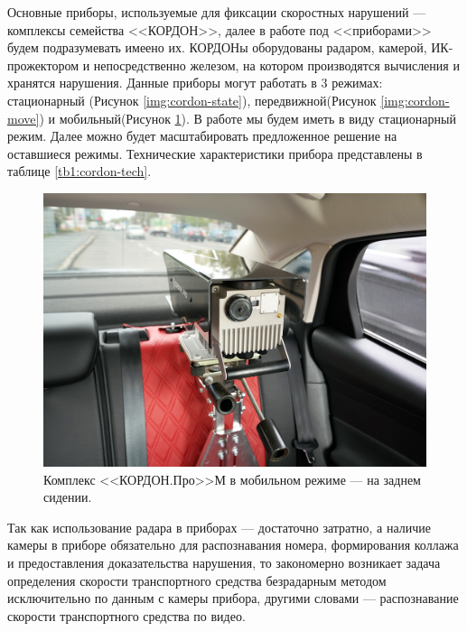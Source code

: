 \documentclass[specification,annotation,times]{itmo-student-thesis}
\begin{document}
Основные приборы, используемые для фиксации скоростных нарушений --- комплексы семейства <<КОРДОН>>, далее в работе под <<приборами>> будем подразумевать имеено их. КОРДОНы оборудованы радаром, камерой, ИК-прожектором и непосредственно железом, на котором производятся вычисления и хранятся нарушения. Данные приборы могут работать в 3 режимах: стационарный (Рисунок \ref{img:cordon-state}), передвижной(Рисунок \ref{img:cordon-move}) и мобильный(Рисунок \ref{img:cordon-mobile}). В работе мы будем иметь в виду стационарный режим. Далее можно будет масштабировать предложенное решение на оставшиеся режимы. Технические характеристики прибора представлены в таблице \ref{tb1:cordon-tech}.

\begin{figure}[!ht]
	\caption{Комплекс <<КОРДОН.Про>>М в мобильном режиме --- на заднем сидении.}\label{img:cordon-mobile}
	\includegraphics[width=0.85\linewidth]{../png/cordon_pro_d_auto.jpg}
	\centering
\end{figure}

Так как использование радара в приборах --- достаточно затратно, а наличие камеры в приборе обязательно для распознавания номера, формирования коллажа и предоставления доказательства нарушения, то закономерно возникает задача определения скорости транспортного средства безрадарным методом исключительно по данным с камеры прибора, другими словами --- распознавание скорости транспортного средства по видео.
\end{document}
